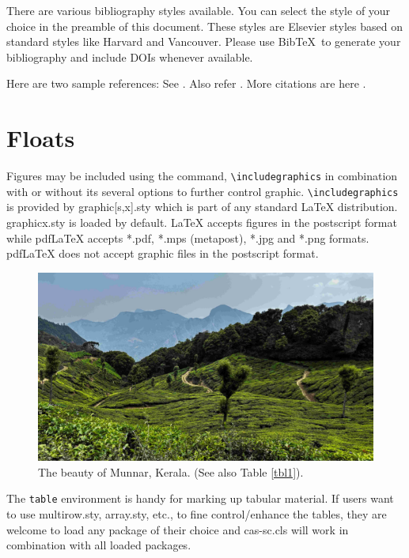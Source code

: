 \documentclass[a4paper,fleqn]{cas-sc}
\begin{document}
There are various bibliography styles available. You can select the
style of your choice in the preamble of this document. These styles are
Elsevier styles based on standard styles like Harvard and Vancouver.
Please use Bib\TeX\ to generate your bibliography and include DOIs
whenever available.

Here are two sample references: 
See \citet{Fortunato2010}. Also refer \citet{Fortunato2010,NewmanGirvan2004}.
More citations are here \citep{Fortunato2010,Vehlowetal2013}.

\section{Floats}
{Figures} may be included using the command, \verb+\includegraphics+ in
combination with or without its several options to further control
graphic. \verb+\includegraphics+ is provided by {graphic[s,x].sty}
which is part of any standard \LaTeX{} distribution.
{graphicx.sty} is loaded by default. \LaTeX{} accepts figures in
the postscript format while pdf\LaTeX{} accepts {*.pdf},
{*.mps} (metapost), {*.jpg} and {*.png} formats. 
pdf\LaTeX{} does not accept graphic files in the postscript format. 

\begin{figure}
	\centering
	\includegraphics[width=.9\textwidth]{figs/cas-munnar-2024.jpg}
	\caption{The beauty of Munnar, Kerala. (See also Table \protect\ref{tbl1}).}
	\label{FIG:1}
\end{figure}


The \verb+table+ environment is handy for marking up tabular
material. If users want to use {multirow.sty},
{array.sty}, etc., to fine control/enhance the tables, they
are welcome to load any package of their choice and
{cas-sc.cls} will work in combination with all loaded
packages.
\end{document}
